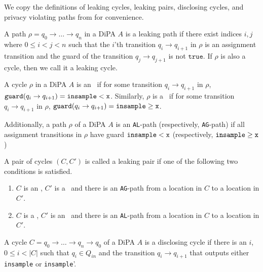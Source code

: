 We copy the definitions of leaking cycles, leaking pairs, disclosing cycles, and privacy violating paths from \cite{chadhaLinearTimeDecidability2021} for convenience.

\begin{defn}
    A path $\rho = q_0\to\ldots \to q_n$ in a DiPA $A$ is a leaking path if there exist indices $i, j$ where $0\leq i < j < n$ such that the $i$'th transition $q_i\to q_{i+1}$ in $\rho$ is an assignment transition and the guard of the transition $q_j \to q_{j+1}$ is not $\texttt{true}$. If $\rho$ is also a cycle, then we call it a leaking cycle.
\end{defn}

\begin{defn}
    A cycle $\rho$ in a DiPA $A$ is an \lcycle~if for some transition $q_i\to q_{i+1}$ in $\rho$, $\guard(q_i\to q_{i+1}) = \lguard[\texttt{x}]$. Similarly, $\rho$ is a \gcycle~if for some transition $q_i\to q_{i+1}$ in $\rho$, $\guard(q_i\to q_{i+1}) = \gguard[\texttt{x}]$.
    
    Additionally, a path $\rho$ of a DiPA $A$ is an \texttt{AL}-path (respectively, \texttt{AG}-path) if all assignment transitions in $\rho$ have guard $\lguard[\texttt{x}]$ (respectively, $\gguard[\texttt{x}]$)
\end{defn}

\begin{defn}
    A pair of cycles $(C, C')$ is called a leaking pair if one of the following two conditions is satisfied.
    \begin{enumerate}
        \item $C$ is an \lcycle, $C'$ is a \gcycle~and there is an \texttt{AG}-path from a location in $C$ to a location in $C'$.
        \item $C$ is a \gcycle, $C'$ is an \lcycle~and there is an \texttt{AL}-path from a location in $C$ to a location in $C'$.
    \end{enumerate}
\end{defn}

\begin{defn}
    A cycle $C = q_0\to \ldots \to q_n \to q_0$ of a DiPA $A$ is a disclosing cycle if there is an $i$, $0 \leq i < |C|$ such that $q_i\in Q_{in}$ and the transition $q_i\to q_{i+1}$ that outputs either \texttt{insample} or \texttt{insample}'.
\end{defn}

